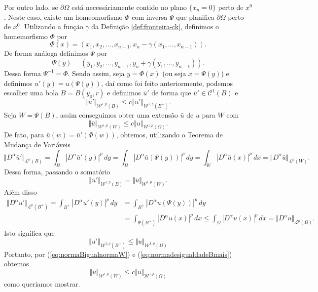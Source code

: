 \documentclass[a4paper, 11pt]{book}
\theoremstyle{definition}
\newcommand{\cC}{\mathcal{C}}
\newcommand{\cL}{\mathcal{L}}
\newcommand{\cW}{\mathcal{W}}
\begin{document}
\begin{prf}
    Por outro lado, se $\partial\Omega$ está necessáriamente contido no plano $\{x_n = 0\}$ perto de $x^0$. Neste caso, existe um homeomorfismo $\Phi$ com inversa $\Psi$ que planifica $\partial \Omega$ perto de $x^0$. Utilizando a função $\gamma$ da Definição \ref{def:fronteira-ck}, definimos o homemorfismo $\Phi$ por
    \[
        \Phi(x) = (x_1,x_2,...,x_{n-1}, x_n - \gamma(x_1,\dots,x_{n-1})).
    \]
    De forma análoga definimos $\Psi$ por
    \[
        \Psi(y) = (y_1,y_2,\dots,y_{n-1},y_n + \gamma(y_1,\dots,y_{n-1})).
    \]
    Dessa forma $\Psi^{-1} = \Phi$. Sendo assim, seja $y = \Phi(x)$ (ou seja $x = \Psi(y)$) e definimos $u'(y) = u(\Psi(y))$, daí como foi feito anteriormente, podemos escolher uma bola $B = B(y_0, r)$ e definimos $\bar u'$ de forma que $\bar u' \in \cC^1(B)$ e
    \begin{equation}
        \Vert \bar u' \Vert_{\cW^{1,p}(B)} \leqslant c \Vert u' \Vert_{\cW^{1,p}(B^+)}.
    \end{equation}
    Seja $W = \Psi(B)$, assim conseguimos obter uma extensão $\bar u$ de $u$ para $W$ com
    \[
        \Vert \bar u \Vert_{\cW^{1,p}(W)} \leqslant c \Vert u \Vert_{\cW^{1,p}(\Omega)}.
    \]
    De fato, para $\bar u (w) = \bar u'(\Phi(w))$, obtemos, utilizando o Teorema de Mudança de Variáveis
    \[
        \Vert D^\alpha \bar u' \Vert_{\cL^p(B)} = \int_B |D^\alpha \bar u'(y)|^p \,dy = \int_B |D^\alpha \bar u (\Psi (y))|^p \,dy = \int_W |D^\alpha \bar u (x)|^p \,dx = \Vert D^\alpha \bar u \Vert_{\cL^p(W)}.
    \]
    Dessa forma, passando o somatório
    \begin{equation} \label{eq:normaBigualnormaW}
        \Vert \bar u' \Vert_{\cW^{1,p}(B)} = \Vert  \bar u \Vert_{\cW^{1,p}(W)}.
    \end{equation}
    Além disso
    \[
        \begin{aligned}
            \Vert D^\alpha u' \Vert_{\cL^p(B^+)} = \int_{B^+} |D^\alpha u'(y) |^p \,dy &= \int_{B^+} |D^\alpha u (\Psi(y))|^p \,dy\\ &= \int_{\Psi(B^+)} |D^\alpha u(x)|^p \,dx \leqslant \int_{\Omega} |D^\alpha u(x)|^p \,dx = \Vert D^\alpha u \Vert_{\cL^p(\Omega)}.
        \end{aligned}
    \]
    Isto significa que
    \begin{equation} \label{eq:normadesigualdadeBmais}
        \Vert u' \Vert_{\cW^{1,p}(B^+)} \leqslant \Vert u \Vert_{\cW^{1,p}(\Omega)}
    \end{equation}
    Portanto, por (\ref{eq:normaBigualnormaW}) e (\ref{eq:normadesigualdadeBmais}) obtemos
    \begin{equation} \label{eq:desigualdadeWO}
        \Vert \bar u \Vert_{\cW^{1,p}(W)} \leqslant c \Vert u \Vert_{\cW^{1,p}(\Omega)}
    \end{equation}
    como queriamos mostrar.


\end{prf}
\end{document}
